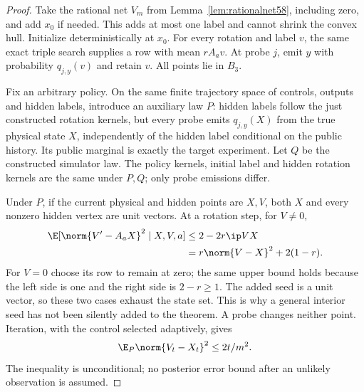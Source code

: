 \begin{proof}
Take the rational net $V_m$ from Lemma~\ref{lem:rationalnet58}, including
zero, and add $x_0$ if needed. This adds at most one label and cannot
shrink the convex hull. Initialize deterministically at $x_0$. For every
rotation and label $v$, the same exact triple search supplies a row with
mean $rA_av$. At probe $j$, emit $y$ with probability $q_{j,y}(v)$ and
retain $v$. All points lie in $B_3$.

Fix an arbitrary policy. On the same finite trajectory space of controls,
outputs and hidden labels, introduce an auxiliary law $P$: hidden labels
follow the just constructed rotation kernels, but every probe emits
$q_{j,y}(X)$ from the true physical state $X$, independently of the
hidden label conditional on the public history. Its public marginal is
exactly the target experiment. Let $Q$ be the constructed simulator law.
The policy kernels, initial label and hidden rotation kernels are the
same under $P,Q$; only probe emissions differ.

Under $P$, if the current physical and hidden points are $X,V$, both
$X$ and every nonzero hidden vertex are unit vectors. At a rotation
step, for $V\ne0$,
\begin{align*}
 \E[\norm{V'-A_aX}^2\mid X,V,a]
 &\le 2-2r\ip V X\\
 &=r\norm{V-X}^2+2(1-r).
\end{align*}
For $V=0$ choose its row to remain at zero; the same upper bound holds
because the left side is one and the right side is $2-r\ge1$.
The added seed is a unit vector, so these two cases exhaust the state
set. This is why a general interior seed has not been silently added
to the theorem. A probe changes neither point. Iteration, with the
control selected adaptively, gives
\begin{equation}\label{eq:processmoment59}
                  \E_P\norm{V_t-X_t}^2\le 2t/m^2.
\end{equation}
The inequality is unconditional; no posterior error bound after an
unlikely observation is assumed.


\end{proof}
